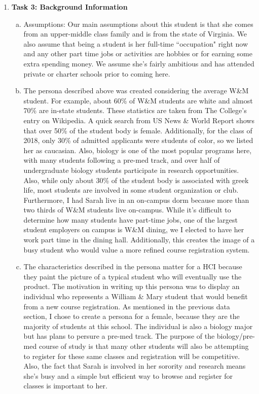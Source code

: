 \documentclass[11pt]{article}
\begin{document}
\begin{enumerate}[1.]
\item \textbf{Task 3: Background Information}
\begin{enumerate}[a)]
\item Assumptions: Our main assumptions about this student is that she comes from an upper-middle class family and is from the state of Virginia.  We also assume that being a student is her full-time ``occupation" right now and any other part time jobs or activities are hobbies or for earning some extra spending money.  We assume she's fairly ambitious and has attended private or charter schools prior to coming here.  
\item The persona described above was created considering the average W\&M student.  For example, about 60\% of W\&M students are white and almost 70\% are in-state students.  These statistics are taken from The College's entry on Wikipedia.  A quick search from US News \& World Report shows that over 50\% of the student body is female.  Additionally, for the class of 2018, only 30\% of admitted applicants were students of color, so we listed her as caucasian.  Also, biology is one of the most popular programs here, with many students following a pre-med track, and over half of undergraduate biology students participate in research opportunities.  Also, while only about 30\% of the student body is associated with greek life, most students are involved in some student organization or club.  Furthermore, I had Sarah live in an on-campus dorm because more than two thirds of W\&M students live on-campus.  While it's difficult to determine how many students have part-time jobs, one of the largest student employers on campus is W\&M dining, we I elected to have her work part time in the dining hall.  Additionally, this creates the image of a busy student who would value a more refined course registration system.  
\item The characteristics described in the persona matter for a HCI because they paint the picture of a typical student who will eventually use the product.  The motivation in writing up this persona was to display an individual who represents a William \& Mary student that would benefit from a new course registration.  As mentioned in the previous data section, I chose to create a persona for a female, because they are the majority of students at this school.  The individual is also a biology major but has plans to persure a pre-med track.  The purpose of the biology/pre-med course of study is that many other students will also be attempting to register for these same classes and registration will be competitive.  Also, the fact that Sarah is involved in her sorority and research means she's busy and a simple but efficient way to browse and register for classes is important to her.  
\end{enumerate}


\end{enumerate}
\end{document}
